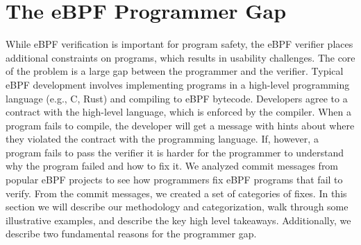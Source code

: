 \section{The eBPF Programmer Gap}
\label{sec:motivation}

While eBPF verification is important for program safety, the eBPF verifier
    places additional constraints on programs, which results in usability
    challenges.
The core of the problem is a large gap between the programmer and the
    verifier.
Typical eBPF development involves implementing programs in a high-level
    programming language (e.g., C, Rust) and compiling to eBPF bytecode.
Developers agree to a contract with the high-level language, which is 
    enforced by the compiler.
When a program fails to compile, the developer will get a message with 
    hints about where they violated
    the contract with the programming language.
If, however, a program fails to pass the verifier it is harder for the programmer
    to understand why the program failed and how to fix it.
We analyzed commit messages from popular eBPF projects to see how programmers fix
    eBPF programs that fail to verify.
From the commit messages, we created a set of categories of fixes.
In this section we will describe our methodology and categorization, walk through some illustrative examples, and describe the key high level takeaways.
Additionally, we describe two fundamental reasons for the programmer gap.




%


